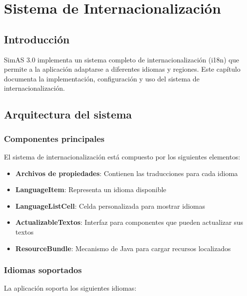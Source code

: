 \chapter{Sistema de Internacionalización}\label{cap-internacionalizacion}

\section{Introducción}

SimAS 3.0 implementa un sistema completo de internacionalización (i18n) que permite a la aplicación adaptarse a diferentes idiomas y regiones. Este capítulo documenta la implementación, configuración y uso del sistema de internacionalización.

\section{Arquitectura del sistema}

\subsection{Componentes principales}

El sistema de internacionalización está compuesto por los siguientes elementos:

\begin{itemize}
    \item \textbf{Archivos de propiedades}: Contienen las traducciones para cada idioma
    \item \textbf{LanguageItem}: Representa un idioma disponible
    \item \textbf{LanguageListCell}: Celda personalizada para mostrar idiomas
    \item \textbf{ActualizableTextos}: Interfaz para componentes que pueden actualizar sus textos
    \item \textbf{ResourceBundle}: Mecanismo de Java para cargar recursos localizados
\end{itemize}

\subsection{Idiomas soportados}

La aplicación soporta los siguientes idiomas:

